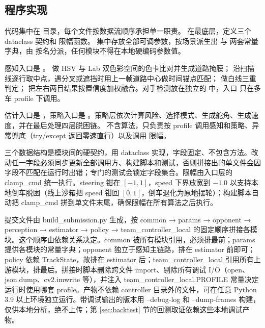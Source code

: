 \documentclass[UTF8,a4paper]{ctexart}
\begin{document}
\subsection{程序实现}\label{sec:impl}

代码集中在  目录，每个文件按数据流顺序承担单一职责。 在最底层，定义三个 dataclass 契约和  限幅函数。 集中存放全部可调参数，按场景派生出  与  两套常量字典，由  按名分派，任何模块不得在本地硬编码参数值。

感知入口是 。 做 HSV 与 Lab 双色彩空间的色卡比对并生成道路掩膜； 沿扫描线逐行取中点，遇分叉或遮挡时用上一帧道路中心做时间锚点匹配； 做白线三重判定； 把左右两目结果按置信度加权融合。对手检测放在独立的  中，入口  只在多车 profile 下调用。

估计入口是 ，策略入口是 。策略层依次计算风险、选择模式、生成舵角、生成速度，并在最后处理四层脱困链。 不含算法，只负责按 profile 调用感知和策略、异常兜底（try/except 返回零速直行）以及调用  限幅。

三个数据结构是模块间的硬契约，用 dataclass 实现，字段固定、不包含方法。改动任一字段必须同步更新全部调用方、构建脚本和测试，否则拼接出的单文件会因字段不匹配在运行时出错；专门的测试会锁定字段集合。限幅由入口层的 clamp\_cmd 统一执行。steering 钳在 $[-1,1]$，speed 下界放宽到 $-1.0$ 以支持本地倒车脱困（线上沙箱把 speed 钳回 $[0,1]$，倒车退化为原地摆轮）；构建脚本自动把 clamp\_cmd 拼到单文件末尾，确保限幅在所有算法之后执行。

提交文件由 build\_submission.py 生成，按 common → params → opponent → perception → estimator → policy → team\_controller\_local 的固定顺序拼接各模块。这个顺序由依赖关系决定。common 被所有模块引用，必须排最前；params 提供各模块的常量字典；opponent 独立于感知主链路，排在 estimator 前即可；policy 依赖 TrackState，故排在 estimator 后；team\_controller\_local 引用所有上游模块，排最后。拼接时脚本删除跨文件 import、剔除所有调试 I/O（open、json.dump、cv2.imwrite 等），并注入 team\_controller\_local.PROFILE 常量决定运行时使用哪套 profile。产物不依赖 controller 目录外的文件，可在任意 Python 3.9 以上环境独立运行。带调试输出的版本用 --debug-log 和 --dump-frames 构建，仅供本地分析，绝不上传；第 \ref{sec:backtest} 节的回测取证依赖这些本地调试产物。
\end{document}

